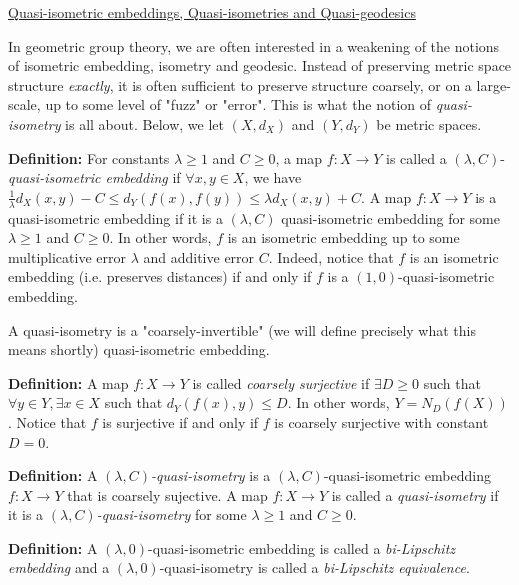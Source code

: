 \documentclass[12pt]{article}
\newcommand{\vs}{\vskip10pt}
\begin{document}
	\vs 
	
	\underline{Quasi-isometric embeddings, Quasi-isometries and Quasi-geodesics}
	
	\vs 
	
	In geometric group theory, we are often interested in a weakening of the notions of isometric embedding, isometry and geodesic. Instead of preserving metric space structure \textit{exactly}, it is often sufficient to preserve structure coarsely, or on a large-scale, up to some level of "fuzz" or "error". This is what the notion of \textit{quasi-isometry} is all about. Below, we let $(X,d_X)$ and $(Y, d_Y)$ be metric spaces.
	
	\vs 
	
	\textbf{Definition: } For constants $\lambda \geq 1$ and $C \geq 0$, a map $f: X \rightarrow Y$ is called a $(\lambda, C)$-\textit{quasi-isometric embedding} if $\forall x,y \in X$, we have $\frac{1}{\lambda} d_X(x,y) - C \leq d_Y(f(x), f(y)) \leq \lambda d_X(x,y) + C$. A map $f: X \rightarrow Y$ is a quasi-isometric embedding if it is a $(\lambda, C)$ quasi-isometric embedding for some $\lambda \geq 1$ and $C \geq 0$. In other words, $f$ is an isometric embedding up to some multiplicative error $\lambda$ and additive error $C$. Indeed, notice that $f$ is an isometric embedding (i.e. preserves distances) if and only if $f$ is a $(1, 0)$-quasi-isometric embedding. 
	
	\vs 
	
	A quasi-isometry is a "coarsely-invertible" (we will define precisely what this means shortly) quasi-isometric embedding. 
	
	\vs 
	
	\textbf{Definition: } A map $f: X \rightarrow Y$ is called \textit{coarsely surjective} if $\exists D \geq 0$ such that $\forall y \in Y, \exists x \in X$ such that $d_Y(f(x), y) \leq D$. In other words, $Y = N_D(f(X))$. Notice that $f$ is surjective if and only if $f$ is coarsely surjective with constant $D = 0$. 
	
	\vs 
	
	\textbf{Definition: } A $(\lambda, C)$\textit{-quasi-isometry} is a $(\lambda, C)$-quasi-isometric embedding $f: X \rightarrow Y$ that is coarsely sujective. A map $f: X \rightarrow Y$ is called a \textit{quasi-isometry} if it is a $(\lambda, C)$\textit{-quasi-isometry} for some $\lambda \geq 1$ and $C \geq 0$.
	
	\vs 
	
	\textbf{Definition: } A $(\lambda, 0)$-quasi-isometric embedding is called a \textit{bi-Lipschitz embedding} and a $(\lambda, 0)$-quasi-isometry is called a \textit{bi-Lipschitz equivalence}.
	
\end{document}
